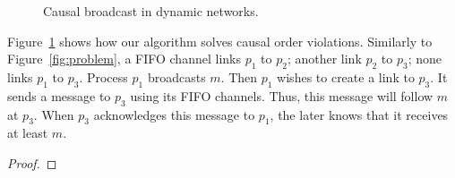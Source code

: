 \begin{figure}
  \begin{center}
    
    \caption{\label{fig:solved}Causal broadcast in dynamic networks.}
  \end{center}
\end{figure}

Figure~\ref{fig:solved} shows how our algorithm solves causal order
violations. Similarly to Figure~\ref{fig:problem}, a FIFO channel links $p_1$ to
$p_2$; another link $p_2$ to $p_3$; none links $p_1$ to $p_3$. Process $p_1$
broadcasts $m$. Then $p_1$ wishes to create a link to $p_3$. It sends a message
to $p_3$ using its FIFO channels. Thus, this message will follow $m$ at
$p_3$. When $p_3$ acknowledges this message to $p_1$, the later knows that it
receives at least $m$.


\begin{theorem}
\end{theorem}

\begin{proof}
\end{proof}

